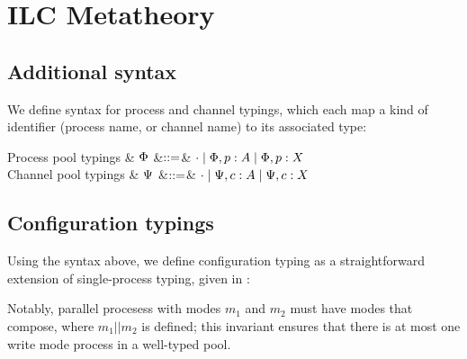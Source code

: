 \section{ILC Metatheory}
\label{sec:ilcproofs}

\subsection{Additional syntax}

We define syntax for process and channel typings, which each map a kind of
identifier (process name, or channel name) to its associated type:

\begin{grammar}
    Process pool typings
    & $\Phi$
    &$\mathrel{::=}$& $\cdot \mathrel{\mid} \Phi,p:A \mathrel{\mid} \Phi,p:X$
    \\
    Channel pool typings
    & $\Psi$
    &$\mathrel{::=}$& $\cdot \mathrel{\mid} \Psi,c:A \mathrel{\mid} \Psi,c:X$
\end{grammar}

\subsection{Configuration typings}

Using the syntax above, we define configuration typing as a straightforward extension
of single-process typing, given in :


Notably, parallel procesess with modes $m_1$ and $m_2$ must have modes
that compose, where $m_1 || m_2$ is defined; this invariant ensures that there
is at most one write mode process in a well-typed pool.

